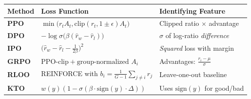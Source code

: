 \begin{center}
    \renewcommand{\arraystretch}{2.2}
    \begin{tabular}{|l|l|l|}
        \hline
        \textbf{Method}                                                               & \textbf{Loss Function} & \textbf{Identifying Feature} \\
        \hline
        \textbf{PPO}                                                                  &
        $\min\bigl(r_t A_t, \text{clip}(r_t, 1{\pm}\epsilon) A_t\bigr)$               &
        Clipped ratio $\times$ advantage                                                                                                      \\
        \hline
        \textbf{DPO}                                                                  &
        $-\log \sigma\bigl(\beta(\hat{r}_w - \hat{r}_l)\bigr)$                        &
        $\sigma$ of log-ratio \emph{difference}                                                                                               \\
        \hline
        \textbf{IPO}                                                                  &
        $\bigl(\hat{r}_w - \hat{r}_l - \tfrac{1}{2\beta}\bigr)^2$                     &
        \emph{Squared} loss with margin                                                                                                       \\
        \hline
        \textbf{GRPO}                                                                 &
        $\text{PPO-clip} + \text{group-normalized } A_i$                              &
        Advantages: $\frac{r_i - \mu}{\sigma}$                                                                                                \\
        \hline
        \textbf{RLOO}                                                                 &
        REINFORCE with $b_i = \frac{1}{G-1}\sum_{j \neq i} r_j$                       &
        Leave-one-out baseline                                                                                                                \\
        \hline
        \textbf{KTO}                                                                  &
        $w(y)(1 - \sigma(\beta \cdot \text{sign}(y) \cdot \Delta))$                   &
        Uses $\text{sign}(y)$ for good/bad                                                                                                    \\

\end{tabular}
\end{center}
